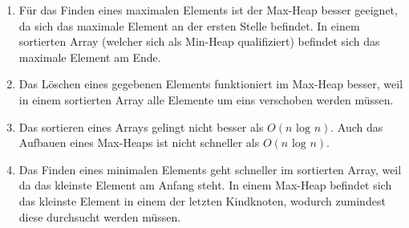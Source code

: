 \documentclass[a4paper, 12pt, margins=3cm]{homework}
\begin{document}
  \begin{problem}
    
  \end{problem}
  \begin{solution}\hfill
    \begin{enumerate}[label=\alph*)]\itemsep0pt
      \item Für das Finden eines maximalen Elements ist der Max-Heap besser geeignet,
            da sich das maximale Element an der ersten Stelle befindet. In einem
            sortierten Array (welcher sich als Min-Heap qualifiziert) befindet sich
            das maximale Element am Ende.

      \item Das Löschen eines gegebenen Elements funktioniert im Max-Heap besser,
            weil in einem sortierten Array alle Elemente um eins verschoben werden
            müssen. 

      \item Das sortieren eines Arrays gelingt nicht besser als $O(n\text{ log }n)$.
            Auch das Aufbauen eines Max-Heaps ist nicht schneller als $O(n\text{ log }n)$.

      \item Das Finden eines minimalen Elements geht schneller im sortierten Array,
            weil da das kleinste Element am Anfang steht. In einem Max-Heap befindet
            sich das kleinste Element in einem der letzten Kindknoten, wodurch 
            zumindest diese durchsucht werden müssen.
    \end{enumerate}
  \end{solution}
\end{document}
